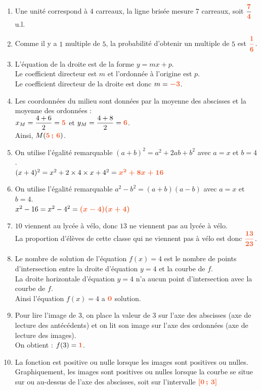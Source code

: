 \documentclass[a4paper,11pt]{article}
\begin{document}
{\begin{seanceD}{}
\begin{enumerate}
	\item Une unité correspond à $4$ carreaux, la ligne brisée mesure $7$ carreaux, soit $\dfrac{{\color[HTML]{f15929}\boldsymbol{7}}}{{\color[HTML]{f15929}\boldsymbol{4}}}$ u.l. 
	\item Comme il y a $1$ multiple de $5$, la probabilité d'obtenir un multiple de $5$ est ${\color[HTML]{f15929}\boldsymbol{\dfrac{1}{6}}}$.
	\item L'équation de la droite est de la forme $y=mx+p$.\\
       Le coefficient directeur est $m$ et l'ordonnée à l'origine est $p$. \\
      Le coefficient directeur de la droite est donc $m={\color[HTML]{f15929}\boldsymbol{-3}}$.
	\item Les coordonnées du milieu sont données par la moyenne des abscisses et la moyenne des ordonnées : \\
      $x_M=\dfrac{4+6}{2}={\color[HTML]{f15929}\boldsymbol{5}}$ et $y_M=\dfrac{4+8}{2}={\color[HTML]{f15929}\boldsymbol{6}}$.\\
      Ainsi,  $M({\color[HTML]{f15929}\boldsymbol{5\,;\,6}})$.
	\item On utilise l'égalité remarquable $(a+b)^2=a^2+2ab+b^2$ avec $a=x$ et $b=4$.\\
      $(x+4)^2=x^2+2 \times 4 \times x+4^2={\color[HTML]{f15929}\boldsymbol{x^2+8x+16}}$
	\item On utilise l'égalité remarquable $a^2-b^2=(a+b)(a-b)$ avec $a=x$ et $b=4$.\\
      $x^2-16=x^2-4^2={\color[HTML]{f15929}\boldsymbol{(x-4)(x+4)}}$
	\item $10$ viennent au lycée à vélo, donc $13$ ne viennent pas au lycée à vélo.\\
      La proportion d’élèves de cette classe qui ne viennent pas à vélo est donc ${\color[HTML]{f15929}\boldsymbol{\dfrac{13}{23}}}$.
	\item Le nombre de solution de l'équation $f(x)=4$ est le nombre de points d'intersection entre la droite d'équation $y=4$ et la courbe de $f$. \\La droite horizontale d'équation $y=4$ n'a aucun point d'intersection avec la courbe de $f$. \\
          Ainsi l'équation $f(x)=4$ a ${\color[HTML]{f15929}\boldsymbol{0}}$ solution.
	\item Pour lire l'image de $3$, on place la valeur de $3$ sur l'axe des abscisses (axe de lecture  des antécédents) et on lit
           son image  sur l'axe des ordonnées (axe de lecture des images). \\
           On obtient :  $f(3)={\color[HTML]{f15929}\boldsymbol{1}}$.
	\item La fonction est positive ou nulle lorsque les images sont positives ou nulles.\\
        Graphiquement, les images sont positives ou nulles  lorsque la courbe se situe sur ou au-dessus  de l'axe des abscisses, soit sur l'intervalle  
        ${\color[HTML]{f15929}\boldsymbol{[0\,;\,3]}}$
        

\end{enumerate}
\end{seanceD}}
\end{document}
